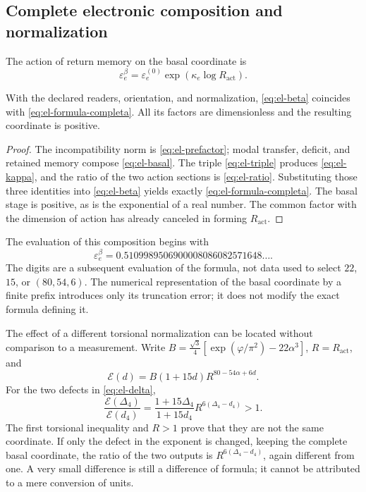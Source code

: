 \subsection{Complete electronic composition and normalization}

\begin{definition}
The action of return memory on the basal coordinate is
\begin{equation}
 \varepsilon_e^\beta
 =\varepsilon_e^{(0)}\exp\!\left(\kappa_e\log R_{\mathrm{act}}\right).
 \label{eq:el-beta}
\end{equation}
\end{definition}

\begin{theorem}
With the declared readers, orientation, and normalization,
\eqref{eq:el-beta} coincides with \eqref{eq:el-formula-completa}. All
its factors are dimensionless and the resulting coordinate is positive.
\end{theorem}
\begin{proof}
The incompatibility norm is \eqref{eq:el-prefactor}; modal transfer,
deficit, and retained memory compose \eqref{eq:el-basal}. The
triple \eqref{eq:el-triple} produces \eqref{eq:el-kappa}, and the ratio of
the two action sections is \eqref{eq:el-ratio}. Substituting those
three identities into \eqref{eq:el-beta} yields exactly
\eqref{eq:el-formula-completa}. The basal stage is positive, as is the
exponential of a real number. The common factor with the dimension of
action has already canceled in forming \(R_{\mathrm{act}}\).
\end{proof}

The evaluation of this composition begins with
\begin{equation}
 \varepsilon_e^\beta
 =0.5109989506900008086082571648\ldots.
 \label{eq:el-beta-decimal}
\end{equation}
The digits are a subsequent evaluation of the formula, not data used
to select \(22\), \(15\), or \((80,54,6)\). The numerical
representation of the basal coordinate by a finite prefix introduces only its
truncation error; it does not modify the exact formula defining it.

The effect of a different torsional normalization can be located
without comparison to a measurement. Write
\(B=\frac{\sqrt3}{4}[\exp(\varphi/\pi^2)-22\alpha^3]\),
\(R=R_{\mathrm{act}}\), and
\[
 \mathcal E(d)=B(1+15d)R^{80-54\alpha+6d}.
\]
For the two defects in \eqref{eq:el-delta},
\begin{equation}
 \frac{\mathcal E(\Delta_4)}{\mathcal E(d_4)}
 =\frac{1+15\Delta_4}{1+15d_4}
   R^{6(\Delta_4-d_4)}>1.
 \label{eq:el-normalizacion-beta}
\end{equation}
The first torsional inequality and \(R>1\) prove that they are not the same
coordinate. If only the defect in the exponent is changed, keeping the
complete basal coordinate, the ratio of the two outputs is
\(R^{6(\Delta_4-d_4)}\), again different from one. A very small
difference is still a difference of formula; it cannot be attributed to
a mere conversion of units.

